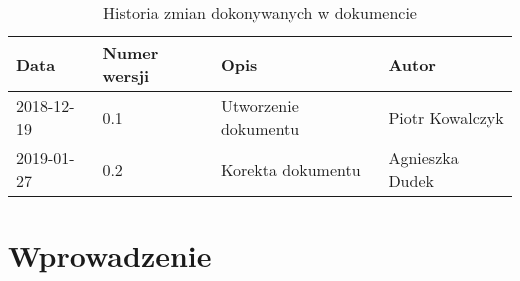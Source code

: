 \documentclass{article}
\begin{document}
\begin{titlepage}







\end{titlepage}

\addtocounter{page}{1}
\newpage

\begin{table}[h!]
 \begin{center}
	\caption{Historia zmian dokonywanych w dokumencie}
   \begin{tabular}{|l|l|l|l|}
		\hline
		Data & Numer wersji & Opis & Autor \\
		\hline \hline
		2018-12-19 & 0.1 & Utworzenie dokumentu & Piotr Kowalczyk \\
		\hline
		2019-01-27 & 0.2 & Korekta dokumentu & Agnieszka Dudek \\
		\hline
		
  \end{tabular}
 \end{center}
\end{table}	


\tableofcontents

\newpage


\section{Wprowadzenie}
\end{document}
